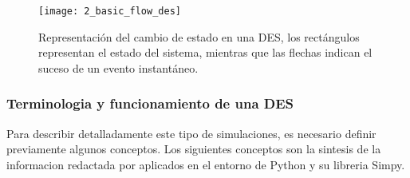 \begin{figure}[h]
	\begin{center}
		\texttt{[image: 2\_basic\_flow\_des]}
	\end{center}
	\caption{Representación del cambio de estado en una DES,
	los rectángulos representan el estado del sistema,
	mientras que las flechas indican el suceso de un evento instantáneo.}
	\label{fig:2_basic_flow_des}
\end{figure}

\subsubsection{Terminologia y funcionamiento de una DES}\label{TF_DES}

Para describir detalladamente este tipo de simulaciones,
es necesario definir previamente algunos conceptos.
Los siguientes conceptos
son la sintesis de la informacion redactada por \citep{banks1998handbook}
aplicados en el entorno de Python y su libreria Simpy.

